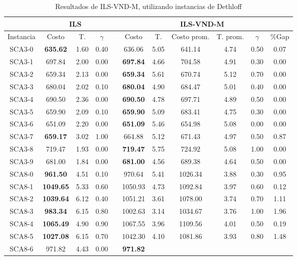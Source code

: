 \begin{table}[h]
\caption{ Resultados de ILS-VND-M, utilizando instancias de Dethloff}
\centering
\scriptsize
\begin{tabular*}{1.00\textwidth}{@{\extracolsep{\fill}} |c||c c c||c c c c c c c|}
\hline
 & \multicolumn{3}{c||}{\bf{ILS}} & \multicolumn{7}{c|}{\bf{ILS-VND-M}}\\\hline
Instancia & Costo & T. & $\gamma$ & & Costo & T. & Costo prom. & T. prom. & $\gamma$ & \%Gap\\ [0.5ex]
\hline\hline
SCA3-0 & \bf{635.62} & 1.60 & 0.40 & & 
636.06 & 5.05 & 641.14 & 4.74 & 0.50 & 0.07\\SCA3-1 & 697.84 & 2.00 & 0.00 & & \bf{697.84} & 
4.66 & 704.58 & 4.91 & 0.30 & 0.00\\SCA3-2 & 659.34 & 2.13 & 0.00 & & \bf{659.34} & 
5.61 & 670.74 & 5.12 & 0.70 & 0.00\\SCA3-3 & 680.04 & 2.02 & 0.10 & & \bf{680.04} & 
4.90 & 684.47 & 5.01 & 0.40 & 0.00\\SCA3-4 & 690.50 & 2.36 & 0.00 & & \bf{690.50} & 
4.78 & 697.71 & 4.89 & 0.50 & 0.00\\SCA3-5 & 659.90 & 2.09 & 0.10 & & \bf{659.90} & 
5.09 & 683.41 & 4.75 & 0.30 & 0.00\\SCA3-6 & 651.09 & 2.20 & 0.00 & & \bf{651.09} & 
5.46 & 654.98 & 5.08 & 0.00 & 0.00\\SCA3-7 & \bf{659.17} & 3.02 & 1.00 & & 
664.88 & 5.12 & 671.43 & 4.97 & 0.50 & 0.87\\SCA3-8 & 719.47 & 1.93 & 0.00 & & \bf{719.47} & 
5.75 & 724.92 & 5.08 & 1.00 & 0.00\\SCA3-9 & 681.00 & 1.84 & 0.00 & & \bf{681.00} & 
4.56 & 689.38 & 4.64 & 0.50 & 0.00\\SCA8-0 & \bf{961.50} & 4.51 & 0.10 & & 
970.64 & 5.41 & 1026.34 & 3.88 & 0.30 & 0.95\\SCA8-1 & \bf{1049.65} & 5.33 & 0.60 & & 
1050.93 & 4.73 & 1092.84 & 3.97 & 0.60 & 0.12\\SCA8-2 & \bf{1039.64} & 6.12 & 0.40 & & 
1051.21 & 3.61 & 1078.00 & 3.74 & 0.70 & 1.11\\SCA8-3 & \bf{983.34} & 6.15 & 0.80 & & 
1002.63 & 3.14 & 1034.67 & 3.76 & 1.00 & 1.96\\SCA8-4 & \bf{1065.49} & 4.90 & 0.90 & & 
1067.55 & 3.96 & 1109.56 & 4.01 & 0.50 & 0.19\\SCA8-5 & \bf{1027.08} & 6.15 & 0.70 & & 
1042.30 & 4.10 & 1081.86 & 3.93 & 0.80 & 1.48\\SCA8-6 & 971.82 & 4.43 & 0.00 & & \bf{971.82} & 

\end{tabular*}
\end{table}
